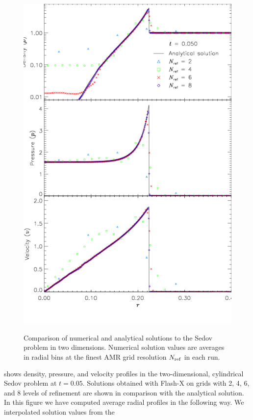 \begin{figure}
\begin{center}
{\leavevmode\includegraphics[width=5in]{Sedov_2d_compare}}
\end{center}
\caption{\label{Fig:Sedov compare} Comparison of numerical and analytical
solutions to the Sedov problem in two dimensions. Numerical solution values
are averages in radial bins at the finest AMR grid resolution $N_{\rm ref}$ in each run.
}
\end{figure}
 shows density, pressure, and velocity
profiles in the two-dimensional, cylindrical Sedov problem at
$t=0.05$. Solutions obtained with Flash-X on grids with 2, 4, 6, and 8
levels of refinement are shown in comparison with the analytical
solution. In this figure we have computed average radial profiles in
the following way. We interpolated solution values from the
